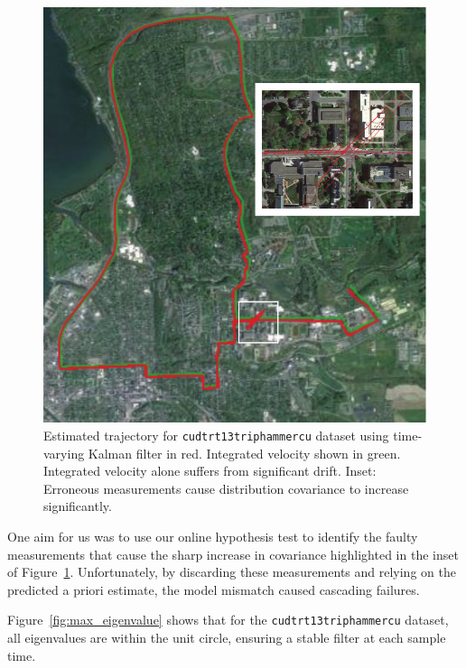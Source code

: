 \begin{figure}[!b]
\includegraphics[width=\columnwidth]{track2_map}
\caption{Estimated trajectory for \texttt{cudtrt13triphammercu} dataset using time-varying Kalman filter in red.  Integrated velocity shown in green.  Integrated velocity alone suffers from significant drift.  Inset: Erroneous measurements cause distribution covariance to increase significantly.}
\label{fig:track2_map}
\end{figure}

One aim for us was to use our online hypothesis test to identify the faulty measurements that cause the sharp increase in covariance highlighted in the inset of Figure~\ref{fig:track2_map}.  Unfortunately, by discarding these measurements and relying on the predicted a priori estimate, the model mismatch caused cascading failures.

Figure~\ref{fig:max_eigenvalue} shows that for the \texttt{cudtrt13triphammercu} dataset, all eigenvalues are within the unit circle, ensuring a stable filter at each sample time.

